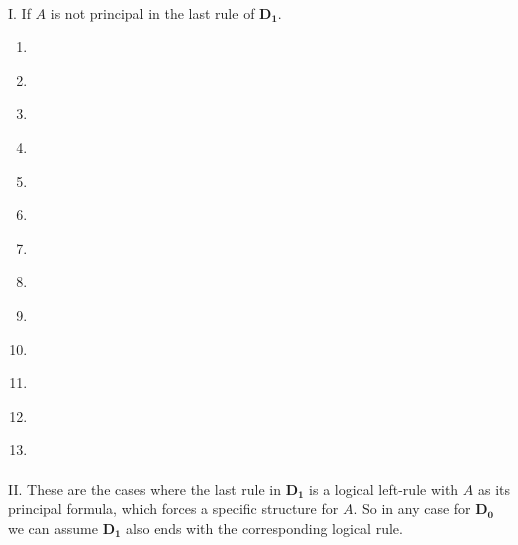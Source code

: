 \begin{enumerate}
	\paragraph{} I. If $A$ is not principal in the last rule of $\mathbf{D_1}$.
	
	\begin{enumerate}[label={\alph*.}]
		\item \label{c:*-lw} 
		
		\item \label{c:*-rw} 
		
		\item \label{c:*-lc} 

		\item \label{c:*-cut} 


		\item \label{c:*-la1} 
		
		\item \label{c:*-la2} 
		
		\item \label{c:*-ra} 
		
		\item \label{c:*-lo} 
		
		\item \label{c:*-ro1} 
		
		\item \label{c:*-ro2} 
		
		\item \label{c:*-li} 
		
		\item \label{c:*-ri} 
		
		

		\item \label{c:*-n} 
	\end{enumerate}

	\paragraph{} II. These are the cases where the last rule in $\mathbf{D_1}$ is a logical left-rule with $A$ as its principal formula, which forces a specific structure for $A$. So in any case for $\mathbf{D_0}$ we can assume $\mathbf{D_1}$ also ends with the corresponding logical rule.


\end{enumerate}
